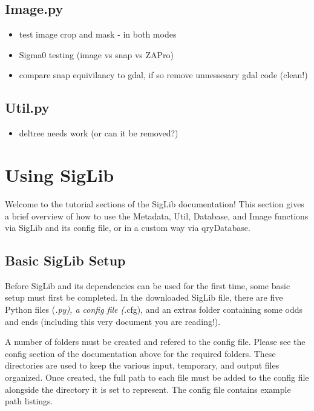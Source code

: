 \documentclass[letterpaper,10pt,openany,oneside]{sphinxmanual}
\begin{document}
\section{Image.py}
\label{project:image-py}\begin{itemize}
\item {} 
test image crop and mask - in both modes

\item {} 
Sigma0 testing (image vs snap vs ZAPro)

\item {} 
compare snap equivilancy to gdal, if so remove unnessesary gdal code (clean!)

\end{itemize}


\section{Util.py}
\label{project:util-py}\begin{itemize}
\item {} 
deltree needs work (or can it be removed?)

\end{itemize}


\chapter{Using SigLib}
\label{tutorial::doc}\label{tutorial:using-siglib}
Welcome to the tutorial sections of the SigLib documentation! This section
gives a brief overview of how to use the Metadata,
Util, Database, and Image functions via SigLib and its config file,
or in a custom way via qryDatabase.


\section{Basic SigLib Setup}
\label{tutorial:basic-siglib-setup}
Before SigLib and its dependencies can be used for the first time, some
basic setup must first be completed. In the downloaded SigLib file, there
are five Python files (\emph{.py), a config file (}.cfg), and an extras folder
containing some odds and ends (including this very document you are reading!).

A number of folders must be created and refered to the
config file. Please see the config section of the documentation above for
the required folders. These directories are used to keep the various input,
temporary, and output files organized. Once created, the full path to each file
must be added to the config file alongside the directory it is set to represent.
The config file contains example path listings.
\end{document}
